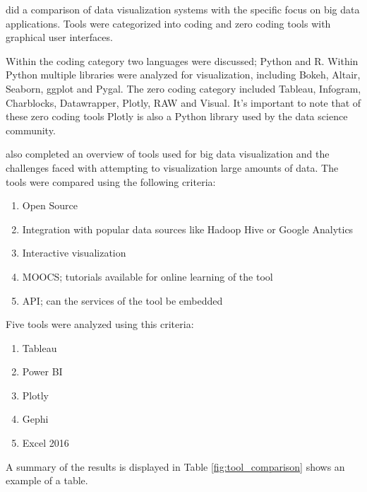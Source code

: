 \cite{fahad2018big} did a comparison of data visualization systems with the specific focus on big data applications. Tools were categorized into coding and zero coding tools with graphical user interfaces. 

Within the coding category two languages were discussed; Python and R. Within Python multiple libraries were analyzed for visualization, including Bokeh, Altair, Seaborn, ggplot and Pygal.
The zero coding category included Tableau, Infogram, Charblocks, Datawrapper, Plotly, RAW and Visual. It's important to note that of these zero coding tools Plotly is also a Python library used by the data science community.

\cite{ali2016big} also completed an overview of tools used for big data visualization and the challenges faced with attempting to visualization large amounts of data. The tools were compared using the following criteria:
\begin{enumerate}
	\item Open Source
	\item Integration with popular data sources like Hadoop Hive or Google Analytics
	\item Interactive visualization
	\item MOOCS; tutorials available for online learning of the tool
	\item API; can the services of the tool be embedded
\end{enumerate}
Five tools were analyzed using this criteria:
\begin{enumerate}
	\item Tableau
	\item Power BI
	\item Plotly
	\item Gephi
	\item Excel 2016
\end{enumerate}
A summary of the results is displayed in 
Table \ref{fig:tool_comparison} shows an example of a table.
